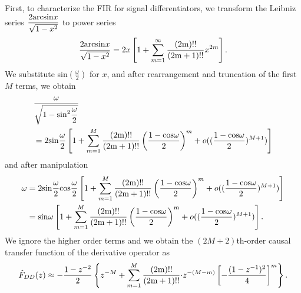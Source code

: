 First, to characterize the FIR for signal differentiators, we
transform the Leibniz series
$\displaystyle\frac{2{\rm{arcsin}}x}{\sqrt{1-x^2}}$ to power series
\cite[]{Lehmer85}
\begin{equation}
  \label{eq:1a}
  \frac{2{\rm{arcsin}}x}{\sqrt{1-x^2}}=2x
       \left[1+\sum_{m=1}^{\infty}\frac{(2{\rm{m}})!!}
        {(2{\rm{m}}+1)!!}x^{2m}\right].
\end{equation}
We substitute sin$\displaystyle(\frac{\omega}{2})$ for $x$, and after
rearrangement and truncation of the first $M$ terms, we obtain
\begin{equation}
\begin{split}
  \label{eq:2a}
  & \frac{\omega}{\sqrt{1-{\rm{sin}}^{2}\displaystyle\frac{\omega}{2}}}\\
  & =2{\rm{sin}}\frac{\omega}{2}\left[1+\sum_{m=1}^{M}\frac{(2{\rm{m}})!!}
   {(2{\rm{m}}+1)!!}
 \left(\frac{1-{\rm{cos}}\omega}{2}\right)^{m}+
    o((\frac{1-{\rm{cos}}\omega}{2})^{M+1})\right]
\end{split}
\end{equation}
and after manipulation
\begin{equation}
\begin{split}
  \label{eq:3a}
  \omega & =2{\rm{sin}}\frac{\omega}{2}{\rm{cos}}\frac{\omega}
    {2}\left[1+\sum_{m=1}^{M}\frac{(2{\rm{m}})!!}{(2{\rm{m}}+1)!!}
 \left(\frac{1-{\rm{cos}}\omega}{2}\right)^{m}+
    o((\frac{1-{\rm{cos}}\omega}{2})^{M+1})\right]\\
         & ={\rm{sin}}\omega\left[1+\sum_{m=1}^{M}
       \frac{(2{\rm{m}})!!}{(2{\rm{m}}+1)!!}
\left(\frac{1-{\rm{cos}}\omega}{2}\right)^{m}+
       o((\frac{1-{\rm{cos}}\omega}{2})^{M+1})\right].
\end{split}
\end{equation}
We ignore the higher order terms and we obtain the $(2M+2)$th-order
causal transfer function of the derivative operator as
\begin{equation}
  \label{eq:4a}
  \hat{F}_{DD}(z)\approx-\frac{1-z^{-2}}{2}\left\{z^{-M}+
     \sum_{m=1}^{M}\frac{(2{\rm{m}})!!}{(2{\rm{m}}+
       1)!!}{\cdot}z^{-(M-m)}\left[-\frac{(1-z^{-1})^2}{4}\right]^m\right\}.
\end{equation}

